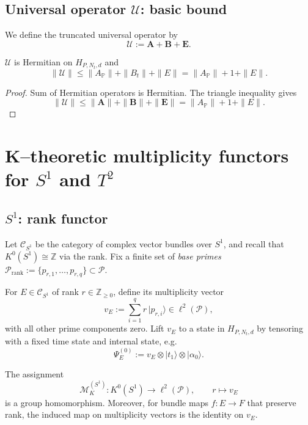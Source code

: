 \documentclass[11pt]{article}
\begin{document}
\subsection{Universal operator \texorpdfstring{$\mathcal{U}$}{U}: basic bound}

We define the truncated universal operator by
\[
\mathcal{U} := \mathbf{A} + \mathbf{B} + \mathbf{E}.
\]

\begin{proposition}
$\mathcal{U}$ is Hermitian on $H_{P,N_t,d}$ and
\[
\|\mathcal{U}\|
  \le \|A_{\mathbb{P}}\| + \|B_t\| + \|E\|
  = \|A_{\mathbb{P}}\| + 1 + \|E\|.
\]
\end{proposition}

\begin{proof}
Sum of Hermitian operators is Hermitian.
The triangle inequality gives
\[
\|\mathcal{U}\| \le \|\mathbf{A}\| + \|\mathbf{B}\| + \|\mathbf{E}\|
                 = \|A_{\mathbb{P}}\| + 1 + \|E\|.
\]
\end{proof}

\section{K--theoretic multiplicity functors for $S^1$ and $T^2$}
\label{app:k-functors}

\subsection{$S^1$: rank functor}

Let $\mathcal{C}_{S^1}$ be the category of complex vector bundles over $S^1$, and recall that $K^0(S^1)\cong \mathbb{Z}$ via the rank.
Fix a finite set of \emph{base primes} $\mathcal{P}_{\mathrm{rank}} := \{p_{r,1},\dots,p_{r,q}\}\subset\mathcal{P}$.

For $E\in\mathcal{C}_{S^1}$ of rank $r\in\mathbb{Z}_{\ge 0}$, define its multiplicity vector
\[
v_E := \sum_{i=1}^q r\,\lvert p_{r,i}\rangle \in \ell^2(\mathcal{P}),
\]
with all other prime components zero.
Lift $v_E$ to a state in $H_{P,N_t,d}$ by tensoring with a fixed time state and internal state, e.g.
\[
\Psi_E^{(0)} := v_E \otimes \lvert t_1\rangle \otimes \lvert \alpha_0\rangle.
\]

\begin{proposition}
The assignment
\[
\mathcal{M}_K^{(S^1)} : K^0(S^1)\to \ell^2(\mathcal{P}),\qquad r\mapsto v_E
\]
is a group homomorphism.
Moreover, for bundle maps $f:E\to F$ that preserve rank, the induced map on multiplicity vectors is the identity on $v_E$.
\end{proposition}
\end{document}
